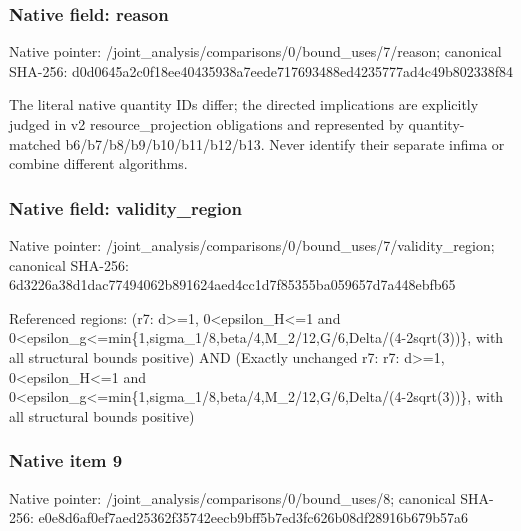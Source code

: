 \documentclass[10pt,a4paper]{article}
\begin{document}
\subsubsection{Native field: reason}
Native pointer: /joint\_\allowbreak{}analysis/comparisons/0/bound\_\allowbreak{}uses/7/reason; canonical SHA-256: d0d0645a2c0f18ee40435938a7eede717693488ed4235777ad4c49b802338f84

\begingroup\raggedright\sloppy The literal native quantity IDs differ;\allowbreak{} the directed implications are explicitly judged in v2 resource\_\allowbreak{}projection obligations and represented by quantity-matched b6/\allowbreak{}b7/\allowbreak{}b8/\allowbreak{}b9/\allowbreak{}b10/\allowbreak{}b11/\allowbreak{}b12/\allowbreak{}b13. Never identify their separate infima or combine different algorithms.\par\endgroup

\subsubsection{Native field: validity\_\allowbreak{}region}
Native pointer: /joint\_\allowbreak{}analysis/comparisons/0/bound\_\allowbreak{}uses/7/validity\_\allowbreak{}region; canonical SHA-256: 6d3226a38d1dac77494062b891624aed4cc1d7f85355ba059657d7a448ebfb65

\begingroup\raggedright\sloppy Referenced regions:\allowbreak{} (r7:\allowbreak{} d>=\allowbreak{}1,\allowbreak{} 0<epsilon\_\allowbreak{}H<=\allowbreak{}1 and 0<epsilon\_\allowbreak{}g<=\allowbreak{}min\{1,\allowbreak{}sigma\_\allowbreak{}1/\allowbreak{}8,\allowbreak{}beta/\allowbreak{}4,\allowbreak{}M\_\allowbreak{}2/\allowbreak{}12,\allowbreak{}G/\allowbreak{}6,\allowbreak{}Delta/\allowbreak{}(4-2sqrt(3))\},\allowbreak{} with all structural bounds positive) AND (Exactly unchanged r7:\allowbreak{} r7:\allowbreak{} d>=\allowbreak{}1,\allowbreak{} 0<epsilon\_\allowbreak{}H<=\allowbreak{}1 and 0<epsilon\_\allowbreak{}g<=\allowbreak{}min\{1,\allowbreak{}sigma\_\allowbreak{}1/\allowbreak{}8,\allowbreak{}beta/\allowbreak{}4,\allowbreak{}M\_\allowbreak{}2/\allowbreak{}12,\allowbreak{}G/\allowbreak{}6,\allowbreak{}Delta/\allowbreak{}(4-2sqrt(3))\},\allowbreak{} with all structural bounds positive)\par\endgroup

\subsubsection{Native item 9}
Native pointer: /joint\_\allowbreak{}analysis/comparisons/0/bound\_\allowbreak{}uses/8; canonical SHA-256: e0e8d6af0ef7aed25362f35742eecb9bff5b7ed3fc626b08df28916b679b57a6
\end{document}
